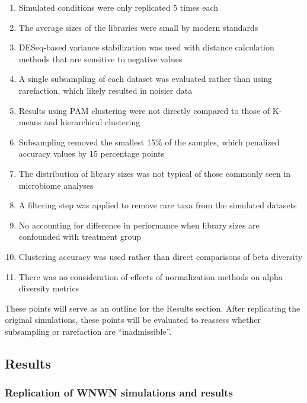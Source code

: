 \documentclass[
]{article}
\providecommand{\tightlist}{%
  \setlength{\itemsep}{0pt}\setlength{\parskip}{0pt}}
\begin{document}
\begin{enumerate}
\def\labelenumi{\arabic{enumi}.}
\tightlist
\item
  Simulated conditions were only replicated 5 times each
\item
  The average sizes of the libraries were small by modern standards
\item
  DESeq-based variance stabilization was used with distance calculation
  methods that are sensitive to negative values
\item
  A single subsampling of each dataset was evaluated rather than using
  rarefaction, which likely resulted in noisier data
\item
  Results using PAM clustering were not directly compared to those of
  K-means and hierarchical clustering
\item
  Subsampling removed the smallest 15\% of the samples, which penalized
  accuracy values by 15 percentage points
\item
  The distribution of library sizes was not typical of those commonly
  seen in microbiome analyses
\item
  A filtering step was applied to remove rare taxa from the simulated
  datasets
\item
  No accounting for difference in performance when library sizes are
  confounded with treatment group
\item
  Clustering accuracy was used rather than direct comparisons of beta
  diversity
\item
  There was no consideration of effects of normalization methods on
  alpha diversity metrics
\end{enumerate}

These points will serve as an outline for the Results section. After
replicating the original simulations, these points will be evaluated to
reassess whether subsampling or rarefaction are ``inadmissible''.

\hypertarget{results}{%
\subsection{Results}\label{results}}

\hypertarget{replication-of-wnwn-simulations-and-results}{%
\subsubsection{Replication of WNWN simulations and
results}\label{replication-of-wnwn-simulations-and-results}}
\end{document}
